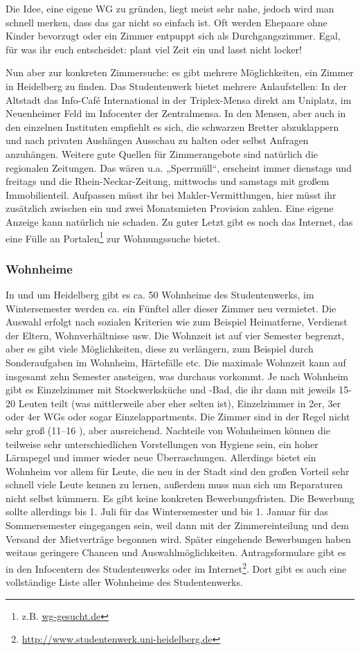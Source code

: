 Die Idee, eine eigene WG zu gründen, liegt meist sehr nahe, jedoch wird man schnell
merken, dass das gar nicht so einfach ist. Oft werden Ehepaare ohne Kinder bevorzugt
oder ein Zimmer entpuppt sich als Durchgangszimmer. Egal, für was ihr euch
entscheidet: plant viel Zeit ein und lasst nicht locker!

Nun aber zur konkreten Zimmersuche: es gibt mehrere Möglichkeiten, ein Zimmer in
Heidelberg zu finden. Das Studentenwerk bietet mehrere Anlaufstellen: In der
Altstadt das Info-Café International in der Triplex-Mensa direkt am Uniplatz, im
Neuenheimer Feld im Infocenter der Zentralmensa. In den Mensen, aber auch in den
einzelnen Instituten empfiehlt es sich, die schwarzen Bretter abzuklappern und nach
privaten Aushängen Ausschau zu halten oder selbst Anfragen anzuhängen. Weitere gute
Quellen für Zimmerangebote sind natürlich die regionalen Zeitungen. Das wären u.a.
„Sperrmüll“, erscheint immer dienstags und freitags und die Rhein-Neckar-Zeitung,
mittwochs und samstags mit großem Immobilienteil. Aufpassen müsst ihr bei
Makler-Vermittlungen, hier müsst ihr zusätzlich zwischen ein und zwei Monatsmieten
Provision zahlen. Eine eigene Anzeige kann natürlich nie schaden. Zu guter Letzt
gibt es noch das Internet, das eine Fülle an Portalen\footnote{z.B. \url{wg-gesucht.de}} zur Wohnungssuche bietet.\\

\subsubsection{Wohnheime}
In und um Heidelberg gibt es ca. 50 Wohnheime des Studentenwerks, im Wintersemester
werden ca. ein Fünftel aller dieser Zimmer neu vermietet. Die Auswahl erfolgt nach
sozialen Kriterien wie zum Beispiel Heimatferne, Verdienst der Eltern,
Wohnverhältnisse usw. Die Wohnzeit ist auf vier Semester begrenzt, aber es gibt
viele Möglichkeiten, diese zu verlängern, zum Beispiel durch Sonderaufgaben im
Wohnheim, Härtefälle etc. Die maximale Wohnzeit kann auf insgesamt zehn Semester ansteigen, was
durchaus vorkommt. Je nach Wohnheim gibt es Einzelzimmer mit Stockwerksküche und
-Bad, die ihr dann mit jeweils 15-20 Leuten teilt (was mittlerweile aber eher selten
ist), Einzelzimmer in 2er, 3er oder 4er WGs oder sogar Einzelappartments. Die Zimmer
sind in der Regel nicht sehr groß (11--16 \squaren\metre), aber ausreichend. Nachteile von
Wohnheimen können die teilweise sehr unterschiedlichen Vorstellungen von Hygiene
sein, ein hoher Lärmpegel und immer wieder neue Überraschungen. Allerdings bietet
ein Wohnheim vor allem für Leute, die neu in der Stadt sind den großen Vorteil sehr
schnell viele Leute kennen zu lernen, außerdem muss man sich um Reparaturen nicht
selbst kümmern. Es gibt keine konkreten Bewerbungsfristen. Die Bewerbung sollte
allerdings bis 1. Juli für das Wintersemester und bis 1. Januar für das
Sommersemester eingegangen sein, weil dann mit der Zimmereinteilung und dem Versand
der Mietverträge begonnen wird. Später eingehende Bewerbungen haben weitaus
geringere Chancen und Auswahlmöglichkeiten. Antragsformulare gibt es in den
Infocentern des Studentenwerks oder im Internet\footnote{\url{http://www.studentenwerk.uni-heidelberg.de}}.
Dort gibt es auch eine vollständige Liste aller Wohnheime des Studentenwerks.

